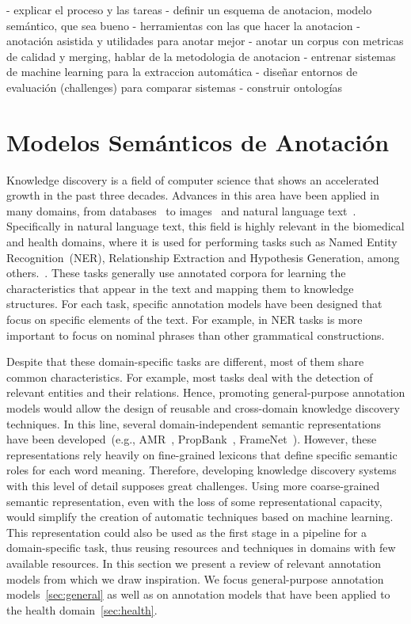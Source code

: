 
- explicar el proceso y las tareas
  - definir un esquema de anotacion, modelo semántico, que sea bueno
  - herramientas con las que hacer la anotacion
  - anotación asistida y utilidades para anotar mejor
  - anotar un corpus con metricas de calidad y merging, hablar de la metodologia de anotacion
  - entrenar sistemas de machine learning para la extraccion automática
  - diseñar entornos de evaluación (challenges) para comparar sistemas
  - construir ontologías

  \section{Modelos Semánticos de Anotación}

  Knowledge discovery is a field of computer science that shows an accelerated growth in the past three decades.
  Advances in this area have been applied in many domains, from databases~\cite{fayyad1996data, knowledgeDatabase} to
  images~\cite{lu2016visual} and natural language text~\cite{carlson2010toward}.
  Specifically in natural language text, this field is highly relevant in the biomedical and health domains,
  where it is used for performing tasks such as
  Named Entity Recognition~(NER), Relationship Extraction and Hypothesis Generation, among others.~\cite{simpson2012biomedical}.
  These tasks generally use annotated corpora for learning the characteristics that appear in the text and mapping them to knowledge structures.
  For each task, specific annotation models have been designed that focus on specific elements of the text.
  For example, in NER tasks is more important to focus on nominal phrases than other grammatical constructions.

  Despite that these domain-specific tasks are different, most of them share common characteristics. For example, most tasks deal with the detection of relevant entities and their relations. Hence, promoting general-purpose annotation models would allow the design of reusable and cross-domain knowledge discovery techniques.
  In this line, several domain-independent semantic representations have been developed~(e.g., AMR~\cite{amr}, PropBank~\cite{propbank}, FrameNet~\cite{framenet}).
  However, these representations rely heavily on fine-grained lexicons that define specific semantic roles for each word meaning. Therefore, developing knowledge discovery systems with this level of detail supposes great challenges. Using more coarse-grained semantic representation, even with the loss of some representational capacity, would simplify the creation of automatic techniques based on machine learning.
  This representation could also be used as the first stage in a pipeline for a domain-specific task, thus reusing resources and techniques in domains with few available resources.
  In this section we present a review of relevant annotation models from which we draw inspiration.
  We focus general-purpose annotation models~\ref{sec:general} as well as on annotation models that have been applied to the health domain~\ref{sec:health}.

